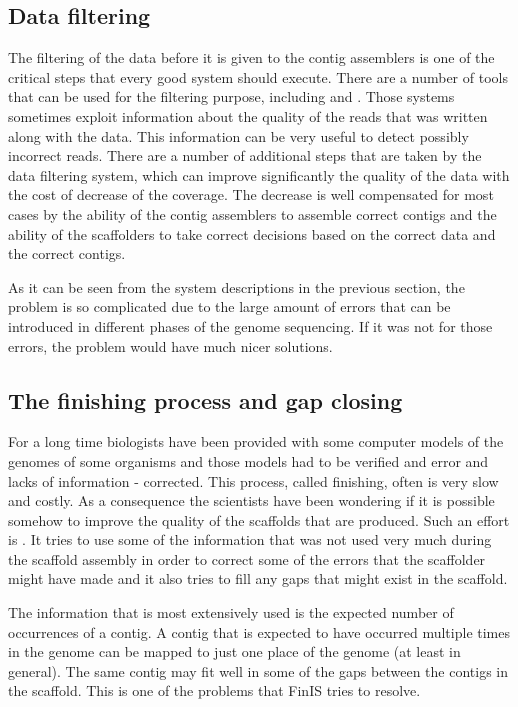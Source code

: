 \documentclass[11pt]{article}
\begin{document}
\subsection{Data filtering} %
\label{sub:Data filtering}
The filtering of the data before it is given to the contig assemblers is one of
the critical steps that every good system should execute. There are a number of
tools that can be used for the filtering purpose, including \cite{quake} and
\cite{filtering-solid}. Those systems sometimes exploit information about the
quality of the reads that was written along with the data. This information can
be very useful to detect possibly incorrect reads. There are a number of
additional steps that are taken by the data filtering system, which can improve
significantly the quality of the data with the cost of decrease of the coverage.
The decrease is well compensated for most cases by the ability of the contig
assemblers to assemble correct contigs and the ability of the scaffolders to
take correct decisions based on the correct data and the correct contigs.

As it can be seen from the system descriptions in the previous section, the
problem is so complicated due to the large amount of errors that can be
introduced in different phases of the genome sequencing. If it was not for those
errors, the problem would have much nicer solutions.

\subsection{The finishing process and gap closing} %
\label{sub:The finishing process and gap closing}
For a long time biologists have been provided with some computer models of the
genomes of some organisms and those models had to be verified and error and lacks
of information - corrected. This process, called finishing, often is very slow
and costly. As a consequence the scientists have been wondering if it is
possible somehow to improve the quality of the scaffolds that are produced. Such
an effort is \cite{finIs}. It tries to use some of the information that was not
used very much during the scaffold assembly in order to correct some of the
errors that the scaffolder might have made and it also tries to fill any gaps
that might exist in the scaffold.

The information that is most extensively used is the expected number of
occurrences of a contig. A contig that is expected to have occurred multiple
times in the genome can be mapped to just one place of the genome (at least in
general). The same contig may fit well in some of the gaps between the contigs
in the scaffold. This is one of the problems that FinIS tries to resolve.
\end{document}
